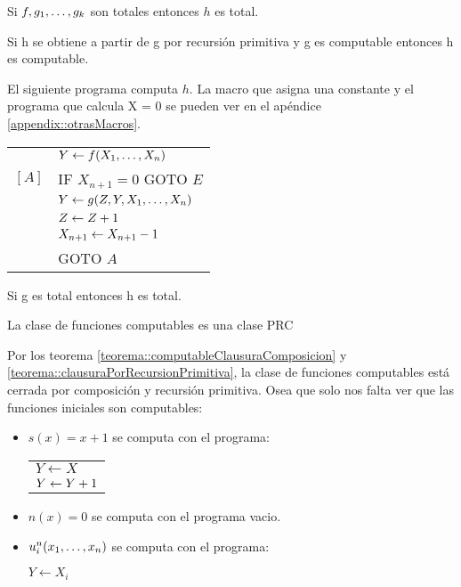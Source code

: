 \begin{proposicion}
	Si $f,g_1,\dots, g_{k}$ son totales entonces $h$ es total.
\end{proposicion}

\begin{teorema}\label{teorema::clausuraPorRecursionPrimitiva}
	Si h se obtiene a partir de g por recursión primitiva y g es computable entonces h es computable.
\end{teorema}

\begin{demo}
	El siguiente programa computa $h$. La macro que asigna una constante y el programa que calcula X = 0 se pueden ver en el apéndice \ref{appendix::otrasMacros}. 
	
	\begin{center}
		\begin{tabular}{ll}
			& $Y \leftarrow f(X_1,\dots, X_{n})$ \\
			$[A]$ & IF $X_{n+1} = 0$ GOTO $E$ \\
			& $Y \leftarrow g(Z,Y,X_1,\dots, X_{n})$ \\
			& $Z \leftarrow Z + 1$ \\
			& $X_{n+1} \leftarrow X_{n+1} - 1$ \\
			& GOTO $A$
		\end{tabular}
	\end{center}
\end{demo}

\begin{proposicion}
	Si g es total entonces h es total.
\end{proposicion}

\begin{teorema}\label{teorema::computablesEsPRC}
	La clase de funciones computables es una clase PRC
\end{teorema}

\begin{demo}[computablesEsPRC]
	Por los teorema \ref{teorema::computableClausuraComposicion} y \ref{teorema::clausuraPorRecursionPrimitiva}, la clase de funciones computables está cerrada por composición y recursión primitiva. Osea que solo nos falta ver que las funciones iniciales son computables:
	\begin{itemize}
		\item $s(x) = x + 1$ se computa con el programa:
		\begin{center}
			\begin{tabular}{l}
			$Y \leftarrow X$\\
			$Y \leftarrow Y + 1$
			\end{tabular}
		\end{center} 
		\item $n(x) = 0$ se computa con el programa vacio.
		\item $u_i^n(x_1,\dots, x_{n})$ se computa con el programa:
		\begin{center}
			$Y \leftarrow X_i$
		\end{center}		
	\end{itemize}
\end{demo}

